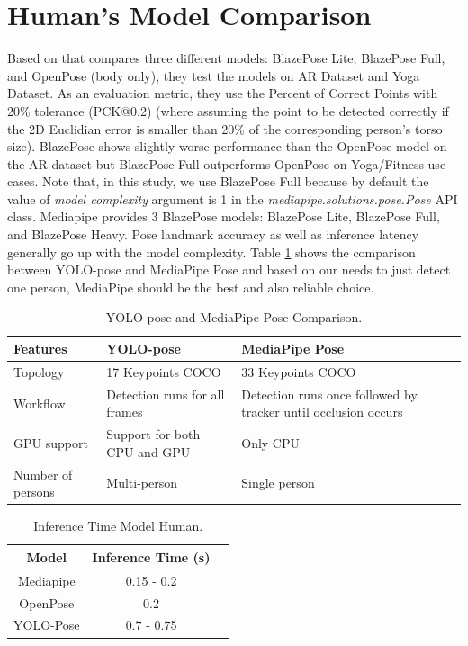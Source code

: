 \section{Human's Model Comparison}
\label{sec:humanmodelcomparison}

Based on \parencite{bazarevsky2020} that compares three different models: BlazePose Lite, BlazePose Full, and OpenPose (body only), they test the models on AR Dataset and Yoga Dataset. As an evaluation metric, they use the Percent of Correct Points with 20\% tolerance (PCK@0.2)
(where assuming the point to be detected correctly if the 2D Euclidian error is smaller than 20\% of the corresponding person's torso size). BlazePose shows slightly worse performance than the OpenPose model on the AR dataset but BlazePose Full outperforms OpenPose on Yoga/Fitness use cases.
Note that, in this study, we use BlazePose Full because by default the value of \emph{model complexity} argument is 1 in the \emph{mediapipe.solutions.pose.Pose} API class. Mediapipe provides 3 BlazePose models: BlazePose Lite, BlazePose Full, and BlazePose Heavy. Pose landmark accuracy as well as inference latency generally go up with the model complexity.
Table \ref{tb:yoloandmediapipecomparison} shows the comparison between YOLO-pose and MediaPipe Pose and based on our needs to just detect one person, MediaPipe should be the best and also reliable choice.  

\begin{longtable}{|p{3cm}|p{5cm}|p{5cm}|}
  \caption{YOLO-pose and MediaPipe Pose Comparison.}
  \label{tb:yoloandmediapipecomparison}\\
  \hline
  \rowcolor[HTML]{C0C0C0}
  \textbf{Features}    & \textbf{YOLO-pose} & \textbf{MediaPipe Pose}\\
  \hline
  Topology             & 17 Keypoints COCO  & 33 Keypoints COCO \\
  \hline
  Workflow             & Detection runs for all frames & Detection runs once followed by tracker until occlusion occurs \\
  \hline
  GPU support          & Support for both CPU and GPU & Only CPU \\
  \hline
  Number of persons    & Multi-person & Single person \\
  \hline
\end{longtable}

\begin{longtable}{|c|c|c|}
  \caption{Inference Time Model Human.}
  \label{tb:inferencehuman}\\
  \hline
  \rowcolor[HTML]{C0C0C0}
  \textbf{Model}    & \textbf{Inference Time (s)} \\
  \hline
  Mediapipe   & 0.15 - 0.2\\
  \hline
  OpenPose    & 0.2\\
  \hline
  YOLO-Pose   & 0.7 - 0.75\\
  \hline
\end{longtable}


